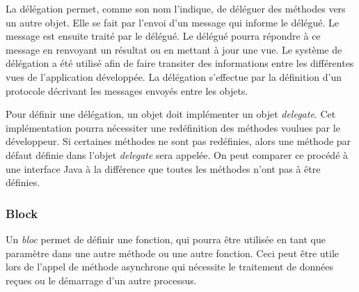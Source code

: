 La délégation permet, comme son nom l'indique, de déléguer des méthodes vers un autre objet. Elle se fait par l'envoi d'un message qui informe le délégué. Le message est ensuite traité par le délégué. Le délégué pourra répondre à ce message en renvoyant un résultat ou en mettant à jour une vue. Le système de délégation a été utilisé afin de faire transiter des informations entre les différentes vues de l'application développée. La délégation s'effectue par la définition d'un protocole décrivant les messages envoyés entre les objets.

Pour définir une délégation, un objet doit implémenter un objet \textit{delegate}. Cet implémentation pourra nécessiter une redéfinition des méthodes voulues par le développeur. Si certaines méthodes ne sont pas redéfinies, alors une méthode par défaut définie dans l'objet \textit{delegate} sera appelée. On peut comparer ce procédé à une interface Java à la différence que toutes les méthodes n'ont pas à être définies.

\subsubsection{Block}

Un \textit{bloc} permet de définir une fonction, qui pourra être utilisée en tant que paramètre dans une autre méthode ou une autre fonction. Ceci peut être utile lors de l'appel de méthode asynchrone qui nécessite le traitement de données reçues ou le démarrage d'un autre processus.